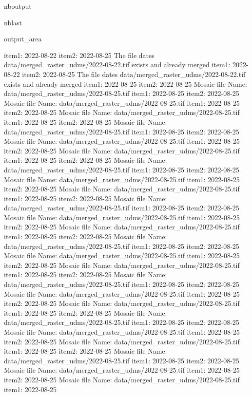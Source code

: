 \documentclass[letterpaper,10pt]{sphinxmanual}
\begin{document}
\begin{sphinxuseclass}{nboutput}
\begin{sphinxuseclass}{nblast}
{\begin{sphinxuseclass}{output_area}
\begin{sphinxuseclass}{}
\begin{sphinxVerbatim}[commandchars=\\\{\}]
item1:  2022-08-22
item2:  2022-08-25
The file dates data/merged\_raster\_udms/2022-08-22.tif exists and already merged
item1:  2022-08-22
item2:  2022-08-25
The file dates data/merged\_raster\_udms/2022-08-22.tif exists and already merged
item1:  2022-08-25
item2:  2022-08-25
Mosaic file Name:  data/merged\_raster\_udms/2022-08-25.tif
item1:  2022-08-25
item2:  2022-08-25
Mosaic file Name:  data/merged\_raster\_udms/2022-08-25.tif
item1:  2022-08-25
item2:  2022-08-25
Mosaic file Name:  data/merged\_raster\_udms/2022-08-25.tif
item1:  2022-08-25
item2:  2022-08-25
Mosaic file Name:  data/merged\_raster\_udms/2022-08-25.tif
item1:  2022-08-25
item2:  2022-08-25
Mosaic file Name:  data/merged\_raster\_udms/2022-08-25.tif
item1:  2022-08-25
item2:  2022-08-25
Mosaic file Name:  data/merged\_raster\_udms/2022-08-25.tif
item1:  2022-08-25
item2:  2022-08-25
Mosaic file Name:  data/merged\_raster\_udms/2022-08-25.tif
item1:  2022-08-25
item2:  2022-08-25
Mosaic file Name:  data/merged\_raster\_udms/2022-08-25.tif
item1:  2022-08-25
item2:  2022-08-25
Mosaic file Name:  data/merged\_raster\_udms/2022-08-25.tif
item1:  2022-08-25
item2:  2022-08-25
Mosaic file Name:  data/merged\_raster\_udms/2022-08-25.tif
item1:  2022-08-25
item2:  2022-08-25
Mosaic file Name:  data/merged\_raster\_udms/2022-08-25.tif
item1:  2022-08-25
item2:  2022-08-25
Mosaic file Name:  data/merged\_raster\_udms/2022-08-25.tif
item1:  2022-08-25
item2:  2022-08-25
Mosaic file Name:  data/merged\_raster\_udms/2022-08-25.tif
item1:  2022-08-25
item2:  2022-08-25
Mosaic file Name:  data/merged\_raster\_udms/2022-08-25.tif
item1:  2022-08-25
item2:  2022-08-25
Mosaic file Name:  data/merged\_raster\_udms/2022-08-25.tif
item1:  2022-08-25
item2:  2022-08-25
Mosaic file Name:  data/merged\_raster\_udms/2022-08-25.tif
item1:  2022-08-25
item2:  2022-08-25
Mosaic file Name:  data/merged\_raster\_udms/2022-08-25.tif
item1:  2022-08-25
item2:  2022-08-25
Mosaic file Name:  data/merged\_raster\_udms/2022-08-25.tif
item1:  2022-08-25
item2:  2022-08-25
Mosaic file Name:  data/merged\_raster\_udms/2022-08-25.tif
item1:  2022-08-25
item2:  2022-08-25
Mosaic file Name:  data/merged\_raster\_udms/2022-08-25.tif
item1:  2022-08-25
item2:  2022-08-25
Mosaic file Name:  data/merged\_raster\_udms/2022-08-25.tif
item1:  2022-08-25
item2:  2022-08-25
Mosaic file Name:  data/merged\_raster\_udms/2022-08-25.tif
item1:  2022-08-25
item2:  2022-08-25
Mosaic file Name:  data/merged\_raster\_udms/2022-08-25.tif
item1:  2022-08-25
item2:  2022-08-25
Mosaic file Name:  data/merged\_raster\_udms/2022-08-25.tif
item1:  2022-08-25

\end{sphinxVerbatim}
\end{sphinxuseclass}
\end{sphinxuseclass}}
\end{sphinxuseclass}
\end{sphinxuseclass}
\end{document}
